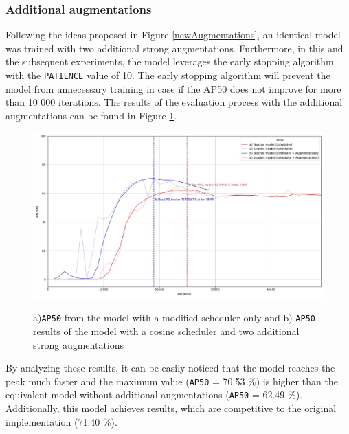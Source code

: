 \documentclass[english, 12pt, a4paper, elec, utf8, a-1b, online]{aaltothesis}
\begin{document}
\subsubsection{Additional augmentations}
\label{augmentations_section} 
Following the ideas proposed in Figure \ref{newAugmentations}, an identical model was trained with two additional strong augmentations. Furthermore, in this and the subsequent  experiments, the model leverages the early stopping algorithm with the \texttt{PATIENCE} value of 10. The early stopping algorithm will prevent the model from unnecessary training in case if the AP50 does not improve for more than 10 000 iterations. The results of the evaluation process with the additional augmentations can be found in Figure \ref{augmentation_experiment}. 
 
\begin{figure}[htb]
	\begin{center}
		\includegraphics[width=14cm]{./AP50_augmentation.jpg}
	\end{center}
	\caption{a)\texttt{AP50} from the model with a modified scheduler only and b) \texttt{AP50} results of the model with a cosine scheduler and two additional strong augmentations}
	\begin{center}
		\label{augmentation_experiment}
	\end{center}
\end{figure}
\FloatBarrier  

By analyzing these results, it can be easily noticed that the model reaches the peak much faster and the maximum value (\texttt{AP50} = 70.53 \%) is higher than the equivalent model without additional augmentations (\texttt{AP50} = 62.49 \%). Additionally, this model achieves results, which are competitive to the original implementation (71.40 \%).
\end{document}
